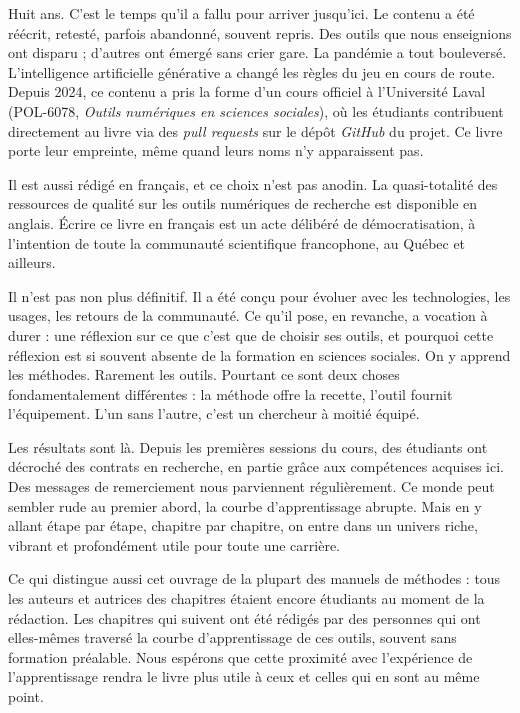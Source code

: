 \documentclass[
  letterpaper,
  DIV=11,
  numbers=noendperiod,
  oneside]{scrreprt}
\begin{document}
Huit ans. C'est le temps qu'il a fallu pour arriver jusqu'ici. Le
contenu a été réécrit, retesté, parfois abandonné, souvent repris. Des
outils que nous enseignions ont disparu ; d'autres ont émergé sans crier
gare. La pandémie a tout bouleversé. L'intelligence artificielle
générative a changé les règles du jeu en cours de route. Depuis 2024, ce
contenu a pris la forme d'un cours officiel à l'Université Laval
(POL-6078, \emph{Outils numériques en sciences sociales}), où les
étudiants contribuent directement au livre via des \emph{pull requests}
sur le dépôt \emph{GitHub} du projet. Ce livre porte leur empreinte,
même quand leurs noms n'y apparaissent pas.

Il est aussi rédigé en français, et ce choix n'est pas anodin. La
quasi-totalité des ressources de qualité sur les outils numériques de
recherche est disponible en anglais. Écrire ce livre en français est un
acte délibéré de démocratisation, à l'intention de toute la communauté
scientifique francophone, au Québec et ailleurs.

Il n'est pas non plus définitif. Il a été conçu pour évoluer avec les
technologies, les usages, les retours de la communauté. Ce qu'il pose,
en revanche, a vocation à durer : une réflexion sur ce que c'est que de
choisir ses outils, et pourquoi cette réflexion est si souvent absente
de la formation en sciences sociales. On y apprend les méthodes.
Rarement les outils. Pourtant ce sont deux choses fondamentalement
différentes : la méthode offre la recette, l'outil fournit l'équipement.
L'un sans l'autre, c'est un chercheur à moitié équipé.

Les résultats sont là. Depuis les premières sessions du cours, des
étudiants ont décroché des contrats en recherche, en partie grâce aux
compétences acquises ici. Des messages de remerciement nous parviennent
régulièrement. Ce monde peut sembler rude au premier abord, la courbe
d'apprentissage abrupte. Mais en y allant étape par étape, chapitre par
chapitre, on entre dans un univers riche, vibrant et profondément utile
pour toute une carrière.

Ce qui distingue aussi cet ouvrage de la plupart des manuels de méthodes
: tous les auteurs et autrices des chapitres étaient encore étudiants au
moment de la rédaction. Les chapitres qui suivent ont été rédigés par
des personnes qui ont elles-mêmes traversé la courbe d'apprentissage de
ces outils, souvent sans formation préalable. Nous espérons que cette
proximité avec l'expérience de l'apprentissage rendra le livre plus
utile à ceux et celles qui en sont au même point.
\end{document}
